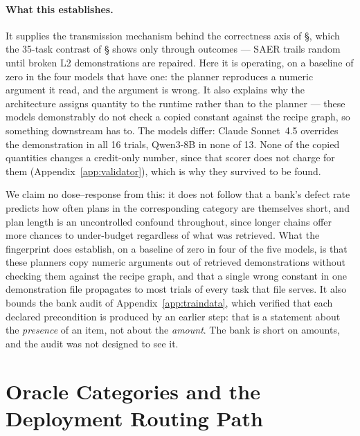 \documentclass[letterpaper]{article} %
\newcommand{\appref}[1]{Appendix~\ref{#1}}
\newcommand{\bodyref}[1]{\getrefnumber{#1}}
\begin{document}
\paragraph{What this establishes.}  It supplies the transmission
mechanism behind the correctness axis of \S\bodyref{sec:knowledge_gap},
which the 35-task contrast of \S\bodyref{sec:knowledge_gap} shows only through
outcomes --- SAER trails random until broken L2 demonstrations are repaired.
Here it is operating, on a baseline of zero in the four models that have one:
the planner reproduces a numeric argument it read, and the argument is
wrong.  It
also explains why the architecture assigns quantity to the runtime
rather than to the planner --- these models demonstrably do not check a
copied constant against the recipe graph, so something downstream has
to.  The models differ: Claude Sonnet~4.5 overrides the
demonstration in all 16 trials, Qwen3-8B in none of 13.  None of the
copied quantities changes a credit-only number, since that scorer does not
charge for them (\appref{app:validator}), which is why they survived to
be found.

We claim no dose--response from this: it does not follow that a bank's
defect rate predicts how often plans in the corresponding category are
themselves short, and plan length is an uncontrolled confound
throughout, since longer chains offer more chances to under-budget
regardless of what was retrieved.  What the fingerprint does establish,
on a baseline of zero in four of the five models, is that these planners copy numeric
arguments out of retrieved demonstrations without checking them against
the recipe graph, and that a single wrong constant in one demonstration
file propagates to most trials of every task that file serves.  It also
bounds the bank audit of \appref{app:traindata}, which verified that
each declared precondition is produced by an earlier step: that is a
statement about the \emph{presence} of an item, not about the
\emph{amount}.  The bank is short on amounts, and the audit was not
designed to see it.

\section{Oracle Categories and the Deployment Routing Path}
\label{app:intent_oracle}
\end{document}
